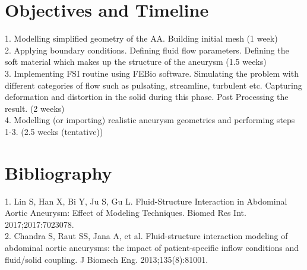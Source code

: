 \documentclass[11pt]{article}
\begin{document}
	\section*{Objectives and Timeline}
	1.	Modelling simplified geometry of the AA. Building initial mesh (1 week) \\
	2.	Applying boundary conditions. Defining fluid flow parameters. Defining the soft material which makes up the structure of the aneurysm (1.5 weeks)\\
	3.	Implementing FSI routine using FEBio software. Simulating the problem with different categories of flow such as pulsating, streamline, turbulent etc.  Capturing deformation and distortion in the solid during this phase. Post Processing the result. (2 weeks)\\
	4.	Modelling (or importing) realistic aneurysm geometries and performing steps 1-3. (2.5 weeks (tentative))
	\section*{Bibliography}
	1. Lin S, Han X, Bi Y, Ju S, Gu L. Fluid-Structure Interaction in Abdominal Aortic Aneurysm: Effect of Modeling Techniques. Biomed Res Int. 2017;2017:7023078.\\
	2. Chandra S, Raut SS, Jana A, et al. Fluid-structure interaction modeling of abdominal aortic aneurysms: the impact of patient-specific inflow conditions and fluid/solid coupling. J Biomech Eng. 2013;135(8):81001.
	
	
	
	
	
\end{document}
